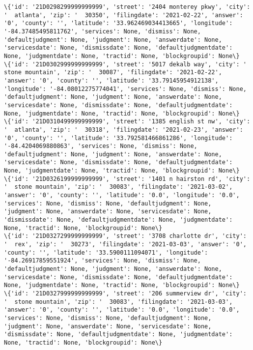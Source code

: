 \documentclass[11pt]{article}
\begin{document}
\begin{Verbatim}[commandchars=\\\{\}]
\{'id': '21D0298299999999999', 'street': '2404 monterey pkwy', 'city': '  atlanta', 'zip': '  30350', 'filingdate': '2021-02-22', 'answer': '0', 'county': '', 'latitude': '33.962469034413665', 'longitude': '-84.37485495811762', 'services': None, 'dismiss': None, 'defaultjudgment': None, 'judgment': None, 'answerdate': None, 'servicesdate': None, 'dismissdate': None, 'defaultjudgmentdate': None, 'judgmentdate': None, 'tractid': None, 'blockgroupid': None\}
\{'id': '21D0302999999999999', 'street': '5017 dekalb way', 'city': '  stone mountain', 'zip': '  30087', 'filingdate': '2021-02-22', 'answer': '0', 'county': '', 'latitude': '33.79145954912138', 'longitude': '-84.08012275774041', 'services': None, 'dismiss': None, 'defaultjudgment': None, 'judgment': None, 'answerdate': None, 'servicesdate': None, 'dismissdate': None, 'defaultjudgmentdate': None, 'judgmentdate': None, 'tractid': None, 'blockgroupid': None\}
\{'id': '21D0310499999999999', 'street': '1385 english st nw', 'city': '  atlanta', 'zip': '  30318', 'filingdate': '2021-02-23', 'answer': '0', 'county': '', 'latitude': '33.792581466861286', 'longitude': '-84.4204069880863', 'services': None, 'dismiss': None, 'defaultjudgment': None, 'judgment': None, 'answerdate': None, 'servicesdate': None, 'dismissdate': None, 'defaultjudgmentdate': None, 'judgmentdate': None, 'tractid': None, 'blockgroupid': None\}
\{'id': '21D0326199999999999', 'street': '1401 n hairston rd', 'city': '  stone mountain', 'zip': '  30083', 'filingdate': '2021-03-02', 'answer': '0', 'county': '', 'latitude': '0.0', 'longitude': '0.0', 'services': None, 'dismiss': None, 'defaultjudgment': None, 'judgment': None, 'answerdate': None, 'servicesdate': None, 'dismissdate': None, 'defaultjudgmentdate': None, 'judgmentdate': None, 'tractid': None, 'blockgroupid': None\}
\{'id': '21D0327299999999999', 'street': '3708 charlotte dr', 'city': '  rex', 'zip': '  30273', 'filingdate': '2021-03-03', 'answer': '0', 'county': '', 'latitude': '33.5900111094071', 'longitude': '-84.26917859551924', 'services': None, 'dismiss': None, 'defaultjudgment': None, 'judgment': None, 'answerdate': None, 'servicesdate': None, 'dismissdate': None, 'defaultjudgmentdate': None, 'judgmentdate': None, 'tractid': None, 'blockgroupid': None\}
\{'id': '21D0327999999999999', 'street': '206 summerview dr', 'city': '  stone mountain', 'zip': '  30083', 'filingdate': '2021-03-03', 'answer': '0', 'county': '', 'latitude': '0.0', 'longitude': '0.0', 'services': None, 'dismiss': None, 'defaultjudgment': None, 'judgment': None, 'answerdate': None, 'servicesdate': None, 'dismissdate': None, 'defaultjudgmentdate': None, 'judgmentdate': None, 'tractid': None, 'blockgroupid': None\}

\end{Verbatim}
\end{document}
